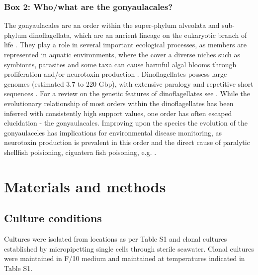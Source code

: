 \documentclass[12pt]{article}
\begin{document}
\subsubsection*{Box 2: Who/what are the gonyaulacales?}
The gonyaulacales are an order within the super-phylum alveolata and sub-phylum dinoflagellata, which are an ancient lineage on the eukaryotic branch of life \cite{moldowan1998biogeochemical}. 
They play a role in several important ecological processes, as members are represented in aquatic environments, where the cover a diverse niches such as symbionts, parasites and some taxa can cause harmful algal blooms through proliferation and/or neurotoxin production \cite{murray2016unravelling}.
Dinoflagellates possess large genomes (estimated 3.7 to 220 Gbp), with extensive paralogy and repetitive short sequences  \cite{casabianca2017genome,murray2016unravelling}. 
For a review on the genetic features of dinoflagellates see \cite{murray2016unravelling}. 
While the evolutionary relationship of most orders within the dinoflagellates has been inferred with consistently high support values, one order has often escaped elucidation - the gonyaulacales. 
Improving upon the species the evolution of the gonyaulaceles has implications for environmental disease monitoring, as neurotoxin production is prevalent in this order and the direct cause of paralytic shellfish poisioning, ciguatera fish poisoning, e.g. \cite{shalchian2006combined,zhang2007three,saldarriaga2004molecular,hoppenrath2010dinoflagellate,murray2005improving}. 

\newpage
\section{Materials and methods}
\subsection*{Culture conditions}
\FloatBarrier
Cultures were isolated from locations as per Table S1 and clonal cultures established by micropipetting single cells through sterile seawater. 
Clonal cultures were maintained in F/10 medium and maintained at temperatures indicated in Table S1. 
\end{document}
